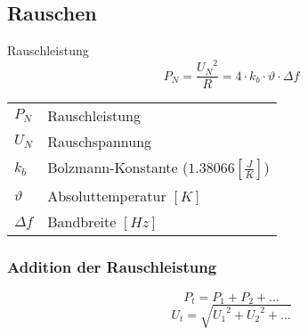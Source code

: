 



\subsection{Rauschen}
Rauschleistung
\[ P_N = \frac{{U_N}^2}{R} = 4 \cdot k_b \cdot \vartheta \cdot \Delta f \]
\begin{tabular}{@{}lp{}}
  $P_N$         & Rauschleistung \\
  $U_N$         & Rauschspannung \\
  $k_b$         & Bolzmann-Konstante ($1.38066 [\frac{J}{K}]$) \\
  $\vartheta$   & Absoluttemperatur $[K]$\\
  $\Delta f$    & Bandbreite $[Hz]$ \\
\end{tabular}

\subsubsection{Addition der Rauschleistung}
\[ P_t = P_1 + P_2 + \dots \]
\[ U_t = \sqrt{{U_1}^2 + {U_2}^2 + \dots} \]